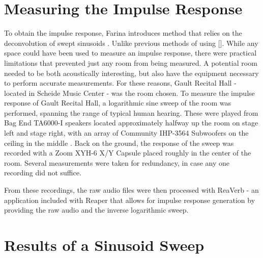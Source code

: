 \section{Measuring the Impulse Response}
To obtain the impulse response, Farina introduces method that relies on the deconvolution of swept sinusoids \cite{farina2000simultaneous}. Unlike previous methods of using []. While any space could have been used to measure an impulse response, there were practical limitations that prevented just any room from being measured. A potential room needed to be both acoustically interesting, but also have the equipment necessary to perform accurate measurements. For these reasons, Gault Recital Hall - located in Scheide Music Center - was the room chosen. To measure the impulse response of Gault Recital Hall, a logarithmic sine sweep of the room was performed, spanning the range of typical human hearing. These were played from Bag End TA6000-I speakers located approximately halfway up the room on stage left and stage right, with an array of Community IHP-3564 Subwoofers on the ceiling in the middle \cite{woosound}. Back on the ground, the response of the sweep was recorded with a Zoom XYH-6 X/Y Capsule placed roughly in the center of the room. Several measurements were taken for redundancy, in case any one recording did not suffice.

From these recordings, the raw audio files were then processed with ReaVerb - an application included with Reaper that allows for impulse response generation by providing the raw audio and the inverse logarithmic sweep.

\section{Results of a Sinusoid Sweep}
